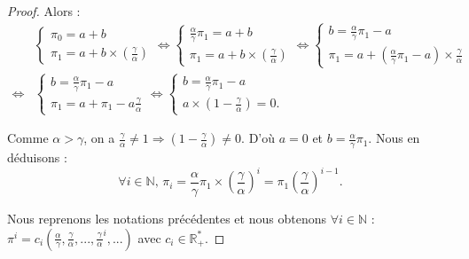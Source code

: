 \documentclass[12pt,a4paper]{report}
\theoremstyle{remark}
\begin{document}
\begin{proof}
Alors :
\begin{align*}
&\left\{
\begin{array}{ll}
  \pi_0 = a + b\\
  \pi_1 = a + b \times \left(\frac{\gamma}{\alpha}\right)
    \end{array}
\right.
\iff \left\{
\begin{array}{ll}
  \frac{\alpha}{\gamma}\pi_1 = a + b\\
  \pi_1 = a + b \times \left(\frac{\gamma}{\alpha}\right)
    \end{array}
\right.
\iff \left\{
\begin{array}{ll}
  b=\frac{\alpha}{\gamma}\pi_1-a\\
  \pi_1=a+(\frac{\alpha}{\gamma}\pi_1-a)\times \frac{\gamma}{\alpha}
    \end{array}
\right.\\
\iff &\left\{
\begin{array}{ll}
         b=\frac{\alpha}{\gamma}\pi_1-a\\
        \pi_1=a+\pi_1-a \frac{\gamma}{\alpha}
    \end{array}
\right.
\iff \left\{
\begin{array}{ll}
        b=\frac{\alpha}{\gamma}\pi_1-a\\
        a \times(1-\frac{\gamma}{\alpha}) = 0 .
    \end{array}
\right.
\end{align*}

Comme $\alpha>\gamma$, on a $\frac{\gamma}{\alpha}\neq1 \Rightarrow (1-\frac{\gamma}{\alpha})\neq 0$.
D'où $a=0 $ et $b = \frac{\alpha}{\gamma}\pi_1$. Nous en déduisons :
$$\forall i \in \mathbb{N}, \, \pi_i =  \frac{\alpha}{\gamma}\pi_1 \times  \left(\frac{\gamma}{\alpha}\right)^i =\pi_1\left(\frac{\gamma}{\alpha}\right)^{i-1}.$$

Nous reprenons les notations précédentes et nous obtenons $\forall i \in \mathbb{N}$ :
$\pi^i = c_i \left(\frac{\alpha}{\gamma},\frac{\gamma}{\alpha},...,\frac{\gamma}{\alpha}^{i},...\right)$ avec $c_i \in\mathbb{R}_+^*.$


\end{proof}
\end{document}
